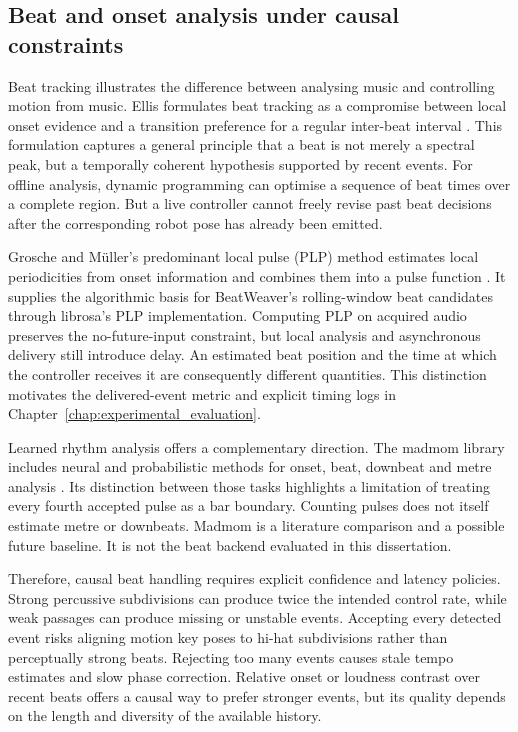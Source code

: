 \subsection{Beat and onset analysis under causal constraints}
\label{subsec:lit_causal_beats}

Beat tracking illustrates the difference between analysing music and
controlling motion from music. Ellis formulates beat tracking as a compromise
between local onset evidence and a transition preference for a regular
inter-beat interval \cite{ellis2007beat}. This formulation captures a general
principle that a beat is not merely a spectral peak, but a temporally coherent
hypothesis supported by recent events. For offline analysis, dynamic programming
can optimise a sequence of beat times over a complete region. But a live controller
cannot freely revise past beat decisions after the corresponding robot pose has
already been emitted.

Grosche and M\"uller's predominant local pulse (PLP) method estimates local
periodicities from onset information and combines them into a pulse function
\cite{grosche2010extracting}. It supplies the algorithmic basis for BeatWeaver's
rolling-window beat candidates through librosa's PLP implementation. Computing
PLP on acquired audio preserves the no-future-input constraint, but local
analysis and asynchronous delivery still introduce delay. An estimated beat
position and the time at which the controller receives it are consequently
different quantities. This distinction motivates the delivered-event metric
and explicit timing logs in Chapter~\ref{chap:experimental_evaluation}.

Learned rhythm analysis offers a complementary direction. The madmom library
includes neural and probabilistic methods for onset, beat, downbeat and metre
analysis \cite{bock2016madmom}. Its distinction between those tasks highlights
a limitation of treating every fourth accepted pulse as a bar boundary.
Counting pulses does not itself estimate metre or downbeats. Madmom is a
literature comparison and a possible future baseline. It is not the beat
backend evaluated in this dissertation.

Therefore, causal beat handling requires explicit confidence and latency
policies. Strong percussive subdivisions can produce twice the intended control
rate, while weak passages can produce missing or unstable events. Accepting
every detected event risks aligning motion key poses to hi-hat subdivisions
rather than perceptually strong beats. Rejecting too many events causes stale
tempo estimates and slow phase correction. Relative onset or loudness contrast
over recent beats offers a causal way to prefer stronger events, but its quality
depends on the length and diversity of the available history.

